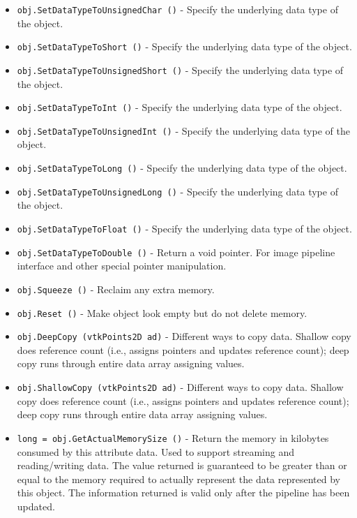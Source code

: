 \begin{itemize}
\item  \verb|obj.SetDataTypeToUnsignedChar ()| -  Specify the underlying data type of the object.

\item  \verb|obj.SetDataTypeToShort ()| -  Specify the underlying data type of the object.

\item  \verb|obj.SetDataTypeToUnsignedShort ()| -  Specify the underlying data type of the object.

\item  \verb|obj.SetDataTypeToInt ()| -  Specify the underlying data type of the object.

\item  \verb|obj.SetDataTypeToUnsignedInt ()| -  Specify the underlying data type of the object.

\item  \verb|obj.SetDataTypeToLong ()| -  Specify the underlying data type of the object.

\item  \verb|obj.SetDataTypeToUnsignedLong ()| -  Specify the underlying data type of the object.

\item  \verb|obj.SetDataTypeToFloat ()| -  Specify the underlying data type of the object.

\item  \verb|obj.SetDataTypeToDouble ()| -  Return a void pointer. For image pipeline interface and other
 special pointer manipulation.

\item  \verb|obj.Squeeze ()| -  Reclaim any extra memory.

\item  \verb|obj.Reset ()| -  Make object look empty but do not delete memory.

\item  \verb|obj.DeepCopy (vtkPoints2D ad)| -  Different ways to copy data. Shallow copy does reference count (i.e.,
 assigns pointers and updates reference count); deep copy runs through
 entire data array assigning values.

\item  \verb|obj.ShallowCopy (vtkPoints2D ad)| -  Different ways to copy data. Shallow copy does reference count (i.e.,
 assigns pointers and updates reference count); deep copy runs through
 entire data array assigning values.

\item  \verb|long = obj.GetActualMemorySize ()| -  Return the memory in kilobytes consumed by this attribute data.
 Used to support streaming and reading/writing data. The value
 returned is guaranteed to be greater than or equal to the
 memory required to actually represent the data represented
 by this object. The information returned is valid only after
 the pipeline has been updated.


\end{itemize}

